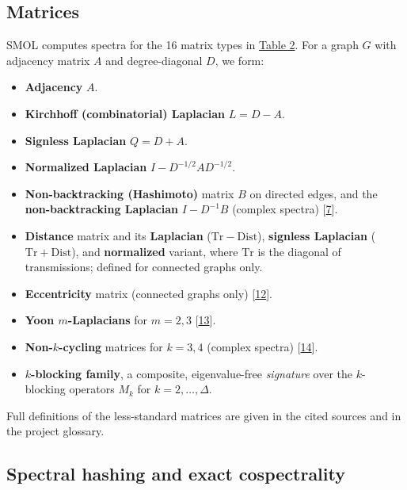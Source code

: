 \documentclass[
]{article}
\begin{document}
\subsection{Matrices}\label{sec-matrices}

SMOL computes spectra for the 16 matrix types in
\hyperref[tbl-matrices]{Table 2}. For a graph \(G\) with adjacency
matrix \(A\) and degree-diagonal \(D\), we form:

\begin{itemize}
\item
  \textbf{Adjacency} \(A\).
\item
  \textbf{Kirchhoff (combinatorial) Laplacian} \(L = D - A\).
\item
  \textbf{Signless Laplacian} \(Q = D + A\).
\item
  \textbf{Normalized Laplacian} \(I - D^{-1/2} A D^{-1/2}\).
\item
  \textbf{Non-backtracking (Hashimoto)} matrix \(B\) on directed edges,
  and the \textbf{non-backtracking Laplacian} \(I - D^{-1}B\) (complex
  spectra) {[}\hyperref[ref-jost2023]{7}{]}.
\item
  \textbf{Distance} matrix and its \textbf{Laplacian}
  (\(\mathrm{Tr} - \mathrm{Dist}\)), \textbf{signless Laplacian}
  (\(\mathrm{Tr} + \mathrm{Dist}\)), and \textbf{normalized} variant,
  where \(\mathrm{Tr}\) is the diagonal of transmissions; defined for
  connected graphs only.
\item
  \textbf{Eccentricity} matrix (connected graphs only)
  {[}\hyperref[ref-mahato2020]{12}{]}.
\item
  \textbf{Yoon \(m\)-Laplacians} for \(m = 2, 3\)
  {[}\hyperref[ref-yoon2025]{13}{]}.
\item
  \textbf{Non-\(k\)-cycling} matrices for \(k = 3, 4\) (complex spectra)
  {[}\hyperref[ref-arrigo2020]{14}{]}.
\item
  \textbf{\(k\)-blocking family}, a composite, eigenvalue-free
  \emph{signature} over the \(k\)-blocking operators \(M_k\) for
  \(k = 2, \ldots, \Delta\).
\end{itemize}

Full definitions of the less-standard matrices are given in the cited
sources and in the project glossary.

\subsection{Spectral hashing and exact cospectrality}\label{sec-hashing}
\end{document}
